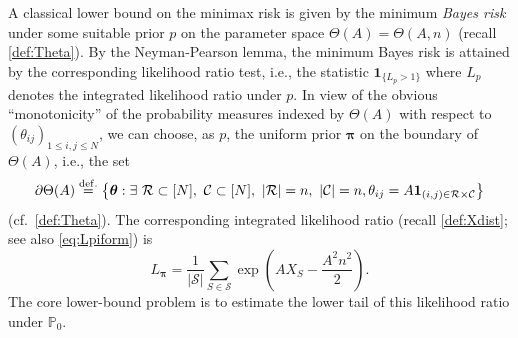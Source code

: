 \documentclass[11pt,reqno,letterpaper]{amsart}
\numberwithin{equation}{section}
\theoremstyle{plain}
\def \btheta{\boldsymbol{\theta}}
\def \bpi{\boldsymbol{\pi}}
\def \P{\mathbb{P}}
\def \cR {\mathcal{R}}
\def \cC {\mathcal{C}}
\begin{document}
A classical lower bound on the minimax risk is given by the minimum {\em Bayes risk} under some suitable prior $p$ on the parameter space $\Theta(A) = \Theta(A, n)$ (recall \eqref{def:Theta}). By the Neyman-Pearson lemma, the minimum Bayes 
risk is attained by the corresponding likelihood ratio test, i.e., the statistic $\mathbf{1}_{\{L_{p} > 1\}}$ where $L_{p}$ denotes the integrated likelihood ratio under $p$. In view of the obvious ``monotonicity'' of the probability 
measures indexed by $\Theta(A)$ with respect to $(\theta_{ij})_{1 \le i, j \le N}$, 
we can choose, as $p$, the uniform prior $\bpi$ on the boundary of $\Theta(A)$, i.e., the set
\begin{equation}\label{def:partialTheta}
    \partial \Theta(A) \stackrel{{\rm def.}}{=} \big\{\btheta:\exists\ \cR\subset[N],\ \cC\subset[N],\ |\cR| = n,\ |\cC| = n,
\theta_{ij} = A\mathbf 1_{(i,j)\in \cR\times\cC}\big\}
\end{equation}
(cf.~\eqref{def:Theta}). The corresponding integrated likelihood ratio (recall \eqref{def:Xdist}; see also \eqref{eq:Lpiform}) is
\begin{equation}\label{def:Lpi}
L_{\bpi}=\frac1{|\mathcal S|}\sum_{S\in\mathcal S}
\exp\left(A X_S-\frac{A^2 n^2}{2}\right).
\end{equation}
The core lower-bound problem is to estimate the lower tail of this likelihood 
ratio under $\P_0$.
\end{document}
